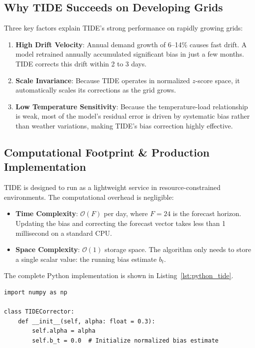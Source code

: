 \documentclass[journal]{IEEEtran}
\begin{document}
\begin{table}[t]
\subsection{Why TIDE Succeeds on Developing Grids}
Three key factors explain TIDE's strong performance on rapidly growing grids:
\begin{enumerate}
    \item \textbf{High Drift Velocity}: Annual demand growth of 6--14\% causes fast drift. A model retrained annually accumulated significant bias in just a few months. TIDE corrects this drift within 2 to 3 days.
    \item \textbf{Scale Invariance}: Because TIDE operates in normalized $z$-score space, it automatically scales its corrections as the grid grows.
    \item \textbf{Low Temperature Sensitivity}: Because the temperature-load relationship is weak, most of the model's residual error is driven by systematic bias rather than weather variations, making TIDE's bias correction highly effective.
\end{enumerate}

\subsection{Computational Footprint \& Production Implementation}
TIDE is designed to run as a lightweight service in resource-constrained environments. The computational overhead is negligible:
\begin{itemize}
    \item \textbf{Time Complexity}: $\mathcal{O}(F)$ per day, where $F = 24$ is the forecast horizon. Updating the bias and correcting the forecast vector takes less than 1 millisecond on a standard CPU.
    \item \textbf{Space Complexity}: $\mathcal{O}(1)$ storage space. The algorithm only needs to store a single scalar value: the running bias estimate $b_t$.
\end{itemize}

The complete Python implementation is shown in Listing~\ref{lst:python_tide}.

\begin{lstlisting}[caption={TIDE Python implementation}, label={lst:python_tide}]
import numpy as np

class TIDECorrector:
    def __init__(self, alpha: float = 0.3):
        self.alpha = alpha
        self.b_t = 0.0  # Initialize normalized bias estimate
        

\end{lstlisting}
\end{table}
\end{document}
